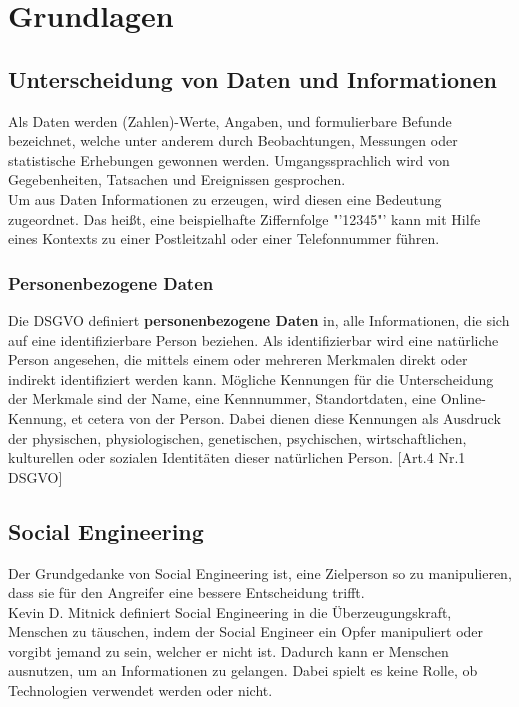 
\chapter {Grundlagen}  %
\label{cha:grundlagen} %

\section{Unterscheidung von Daten und Informationen}
Als Daten werden (Zahlen)-Werte, Angaben, und formulierbare Befunde bezeichnet, welche unter anderem durch Beobachtungen, Messungen oder statistische Erhebungen gewonnen werden. \cite{daten} Umgangssprachlich wird von Gegebenheiten, Tatsachen und Ereignissen gesprochen.\cite{proebster2015rechnernetze}\\
Um aus Daten Informationen zu erzeugen, wird diesen eine Bedeutung zugeordnet. \cite{proebster2015rechnernetze} Das heißt, eine beispielhafte Ziffernfolge "'12345"' kann mit Hilfe eines Kontexts zu einer Postleitzahl oder einer Telefonnummer führen.
	\subsection{Personenbezogene Daten}
	Die DSGVO definiert \textbf{personenbezogene Daten} in, alle Informationen, die sich auf eine identifizierbare Person beziehen. Als identifizierbar wird eine natürliche Person angesehen, die mittels einem oder mehreren Merkmalen direkt oder indirekt identifiziert werden kann. Mögliche Kennungen für die Unterscheidung der Merkmale sind der Name, eine Kennnummer, Standortdaten, eine Online-Kennung, et cetera von der Person. Dabei dienen diese Kennungen als Ausdruck der physischen, physiologischen, genetischen, psychischen, wirtschaftlichen, kulturellen oder sozialen Identitäten dieser natürlichen Person. [Art.4 Nr.1 DSGVO]

\section{Social Engineering} %
\label {sec:Social Engineering} %
	Der Grundgedanke von Social Engineering ist, eine Zielperson so zu manipulieren, dass sie für den Angreifer eine bessere Entscheidung trifft. \cite{ArtOfHumanHacking} \\
	Kevin D. Mitnick definiert Social Engineering in die Überzeugungskraft, Menschen zu täuschen, indem der Social Engineer ein Opfer manipuliert oder vorgibt jemand zu sein, welcher er nicht ist. Dadurch kann er Menschen ausnutzen, um an Informationen zu gelangen. Dabei spielt es keine Rolle, ob Technologien verwendet werden oder nicht.\cite{ArtOfDeception}
	
